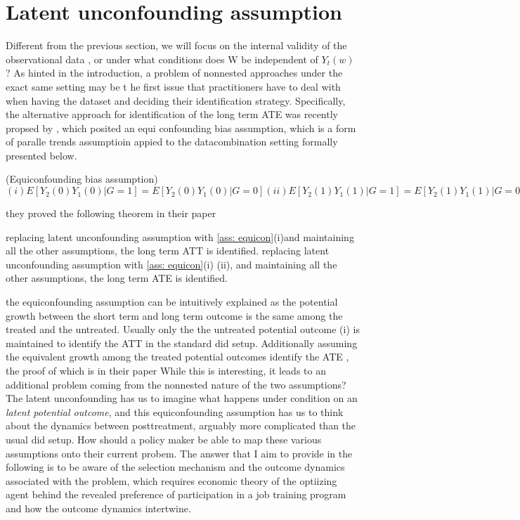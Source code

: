 \documentclass{article}
\begin{document}
\section{Latent unconfounding assumption}











     Different from the previous section, we will focus on the internal validity of the observational data , or under what conditions does W be independent of $Y_t(w)$ ?
     As hinted in the introduction, a problem of nonnested approaches under the exact same setting may be t he first issue that practitioners have to deal with when having the dataset and deciding their identification strategy. 
     Specifically, the alternative approach for identification of the long term ATE was recently propsed by \cite{ghassami et al 2022} , which posited an equi confounding bias assumption, which is a form of paralle trends assumptioin appied to the datacombination setting formally presented below.
    \begin{assumption}(Equiconfounding bias assumption)
     \label{ass: equicon}
    $ (i) E[Y_2(0)  Y_1(0)| G= 1] = E[Y_2(0)  Y_1(0) | G=0] 
     (ii) E[Y_2(1)  Y_1(1)| G= 1] = E[Y_2(1)  Y_1(1) | G=0]$
     \end{assumption}
 they proved the following theorem in their paper
 \begin{theorem}
 replacing latent unconfounding assumption with \ref{ass: equicon}(i)and maintaining all the other assumptions, the long term ATT is identified.
 replacing latent unconfounding assumption with \ref{ass: equicon}(i) (ii), and maintaining all the other assumptions, the long term ATE is identified.
 \end{theorem}
 the equiconfounding assumption can be intuitively explained as the potential growth between the short term and long term outcome is the same among the treated and the untreated. Usually only the the untreated potential outcome (i) is maintained to identify the ATT in the standard did setup. Additionally assuming the equivalent growth among the treated potential outcomes identify the ATE , the proof of which is in their paper \cite{ghassami 202}
 While this is interesting, it leads to an additional problem coming from the nonnested nature of the two assumptions? The latent unconfounding has us to imagine what happens under condition on an \textit{latent potential outcome}, and this equiconfounding assumption has us to think about the dynamics between posttreatment, arguably more complicated than the usual did setup.  How should a policy maker be able to map these various assumptions onto their current probem. The answer that I aim to provide in the following is to be aware of the selection mechanism and the outcome dynamics associated with the problem, which requires economic theory of the optiizing agent behind the revealed preference of participation in a job training program and how the outcome dynamics intertwine.
\end{document}
